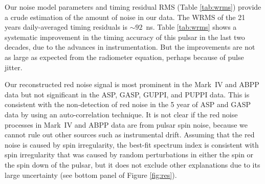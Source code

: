 Our noise model parameters and timing residual RMS (Table \ref{tab:wrms})
provide a crude estimation of the amount of noise in our data. The WRMS of
the 21 years daily-averaged timing residuals is $\sim 92$~ns. 
Table \ref{tab:wrms} shows a systematic improvement in the timing accuracy of
this pulsar in the last two decades, due to the advances in instrumentation.
But the improvements are not as large as expected from the radiometer 
equation, perhaps because of pulse jitter. 

Our reconstructed red noise signal is most prominent in the Mark~IV and ABPP data
but not significant in the ASP, GASP, GUPPI, and PUPPI data.
This is consistent with the non-detection of red noise in the 5 year 
of ASP and GASP data by \citet{pjl+13} using an auto-correlation technique.
It is not clear if the red noise processes in Mark~IV and ABPP data
are from pulsar spin noise, because we cannot rule out other sources such as
instrumental drift.
Assuming that the red noise is caused by spin irregularity,
the best-fit spectrum index is consistent with
spin irregularity that was caused by random perturbations in
either the spin or the spin down of the pulsar, but it does not exclude other explanations
due to its large uncertainty (see bottom panel of Figure \ref{fig:res}).



